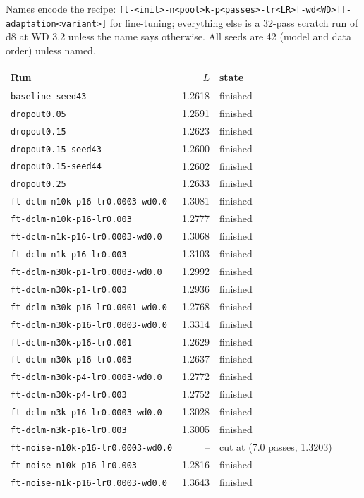 \small Names encode the recipe: \texttt{ft-<init>-n<pool>k-p<passes>-lr<LR>[-wd<WD>][-adaptation<variant>]} for fine-tuning; everything else is a 32-pass scratch run of d8 at WD 3.2 unless the name says otherwise. All seeds are 42 (model and data order) unless named.

\begin{longtable}{lrl}\toprule Run & $L$ & state \\ \midrule
\texttt{baseline-seed43} & 1.2618 & finished \\
\texttt{dropout0.05} & 1.2591 & finished \\
\texttt{dropout0.15} & 1.2623 & finished \\
\texttt{dropout0.15-seed43} & 1.2600 & finished \\
\texttt{dropout0.15-seed44} & 1.2602 & finished \\
\texttt{dropout0.25} & 1.2633 & finished \\
\texttt{ft-dclm-n10k-p16-lr0.0003-wd0.0} & 1.3081 & finished \\
\texttt{ft-dclm-n10k-p16-lr0.003} & 1.2777 & finished \\
\texttt{ft-dclm-n1k-p16-lr0.0003-wd0.0} & 1.3068 & finished \\
\texttt{ft-dclm-n1k-p16-lr0.003} & 1.3103 & finished \\
\texttt{ft-dclm-n30k-p1-lr0.0003-wd0.0} & 1.2992 & finished \\
\texttt{ft-dclm-n30k-p1-lr0.003} & 1.2936 & finished \\
\texttt{ft-dclm-n30k-p16-lr0.0001-wd0.0} & 1.2768 & finished \\
\texttt{ft-dclm-n30k-p16-lr0.0003-wd0.0} & 1.3314 & finished \\
\texttt{ft-dclm-n30k-p16-lr0.001} & 1.2629 & finished \\
\texttt{ft-dclm-n30k-p16-lr0.003} & 1.2637 & finished \\
\texttt{ft-dclm-n30k-p4-lr0.0003-wd0.0} & 1.2772 & finished \\
\texttt{ft-dclm-n30k-p4-lr0.003} & 1.2752 & finished \\
\texttt{ft-dclm-n3k-p16-lr0.0003-wd0.0} & 1.3028 & finished \\
\texttt{ft-dclm-n3k-p16-lr0.003} & 1.3005 & finished \\
\texttt{ft-noise-n10k-p16-lr0.0003-wd0.0} & -- & cut at (7.0 passes, 1.3203) \\
\texttt{ft-noise-n10k-p16-lr0.003} & 1.2816 & finished \\
\texttt{ft-noise-n1k-p16-lr0.0003-wd0.0} & 1.3643 & finished \\

\end{longtable}
